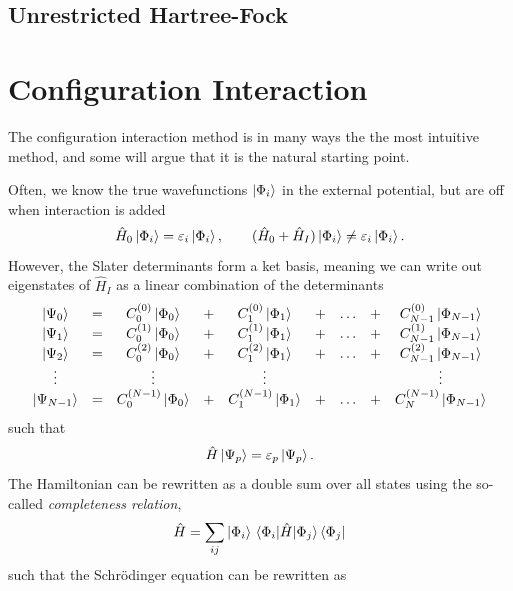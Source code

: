 \subsection{Unrestricted Hartree-Fock}

\section{Configuration Interaction} \label{sec:ci}
The configuration interaction method is in many ways the the most intuitive method, and some will argue that it is the natural starting point. 

Often, we know the true wavefunctions $\ket{\Phi_i}$ in the external potential, but are off when interaction is added
\begin{equation}
\hat{H}_0\ket{\Phi_i}=\varepsilon_i\ket{\Phi_i},\qquad (\hat{H}_0+\hat{H}_I)\ket{\Phi_i}\neq\varepsilon_i\ket{\Phi_i}.
\end{equation}
However, the Slater determinants form a ket basis, meaning we can write out eigenstates of $\hat{H}_I$ as a linear combination of the determinants
\begin{equation}
\mqty{
	\ket{\Psi_0}&=&C_0^{(0)}\ket{\Phi_0}&+&C_1^{(0)}\ket{\Phi_1}&+&\hdots&+&C_{N-1}^{(0)}\ket{\Phi_{N-1}}\\
	\ket{\Psi_1}&=&C_0^{(1)}\ket{\Phi_0}&+&C_1^{(1)}\ket{\Phi_1}&+&\hdots&+&C_{N-1}^{(1)}\ket{\Phi_{N-1}}\\
	\ket{\Psi_2}&=&C_0^{(2)}\ket{\Phi_0}&+&C_1^{(2)}\ket{\Phi_1}&+&\hdots&+&C_{N-1}^{(2)}\ket{\Phi_{N-1}}\\
	\vdots&&\vdots&&\vdots&&&&\vdots\\
	\ket{\Psi_{N-1}}&=&C_0^{(N-1)}\ket{\Phi_0}&+&C_1^{(N-1)}\ket{\Phi_1}&+&\hdots&+&C_N^{(N-1)}\ket{\Phi_{N-1}}
}
\end{equation}
such that 
\begin{equation}
\hat{H}\ket{\Psi_p}=\varepsilon_p\ket{\Psi_p}.
\end{equation}
The Hamiltonian can be rewritten as a double sum over all states using the so-called \textit{completeness relation}, 
\begin{equation}
\hat{H}=\sum_{ij}\ket{\Phi_i}\mel{\Phi_i}{\hat{H}}{\Phi_j}\bra{\Phi_j}
\end{equation}
such that the Schr\"odinger equation can be rewritten as
